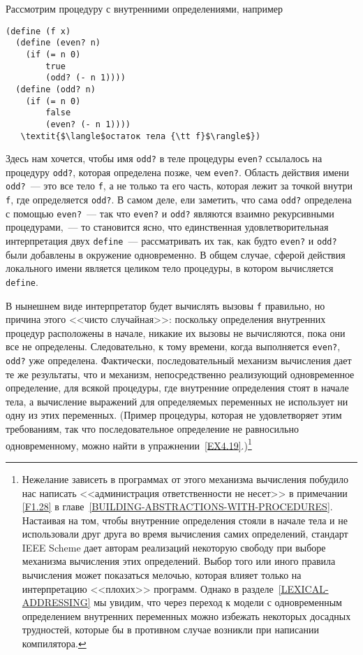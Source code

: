 Рассмотрим процедуру с внутренними определениями, например

\begin{Verbatim}[fontsize=\small]
(define (f x)
  (define (even? n)
    (if (= n 0)
        true
        (odd? (- n 1))))
  (define (odd? n)
    (if (= n 0)
        false
        (even? (- n 1))))
   \textit{$\langle$остаток тела {\tt f}$\rangle$})
\end{Verbatim}
Здесь нам хочется, чтобы имя {\tt odd?} в теле процедуры
{\tt even?} ссылалось на процедуру {\tt odd?}, которая
определена позже, чем {\tt even?}.  Область действия имени
{\tt odd?}~--- это все тело {\tt f}, а не только та его
часть, которая лежит за точкой внутри {\tt f}, где
определяется {\tt odd?}.  В самом деле, ели заметить, что
сама {\tt odd?} определена с помощью {\tt even?}~--- так что
{\tt even?} и {\tt odd?} являются взаимно рекурсивными
процедурами,~--- то становится ясно, что единственная удовлетворительная
интерпретация двух {\tt define}~--- рассматривать их
так, как будто {\tt even?} и {\tt odd?} были добавлены
в окружение одновременно.  В общем случае, сферой действия локального
имени является целиком тело процедуры, в котором вычисляется
{\tt define}.

В нынешнем виде интерпретатор будет вычислять
вызовы {\tt f} правильно, но причина этого <<чисто случайная>>:
поскольку определения внутренних процедур расположены в
начале, никакие их вызовы не вычисляются, пока они все не
определены.  Следовательно, к тому времени, когда выполняется
{\tt even?}, {\tt odd?} уже определена.  Фактически,
последовательный механизм вычисления дает те же результаты, что и
механизм, непосредственно реализующий одновременное определение,
для всякой процедуры, где внутренние определения стоят в начале тела,
а вычисление выражений для определяемых переменных не использует ни
одну из этих переменных.  (Пример процедуры, которая не удовлетворяет этим
требованиям, так что последовательное определение не равносильно
одновременному, можно найти в 
упражнении~\ref{EX4.19}.)\footnote{Нежелание зависеть в программах от
этого механизма вычисления побудило нас написать <<администрация 
ответственности не
несет>> в примечании  \ref{F1.28} в 
главе~\ref{BUILDING-ABSTRACTIONS-WITH-PROCEDURES}.
Настаивая на
том, чтобы внутренние определения стояли в начале тела и не использовали
друг друга во время вычисления самих определений, стандарт IEEE Scheme
дает авторам реализаций некоторую свободу при выборе механизма
вычисления этих определений.  Выбор того или иного правила вычисления
может показаться мелочью, которая влияет только на интерпретацию
<<плохих>> программ.  Однако в 
разделе~\ref{LEXICAL-ADDRESSING} мы увидим, что через
переход к модели с
одновременным определением внутренних переменных можно избежать
некоторых досадных трудностей, которые бы в противном случае
возникли при написании компилятора.}

